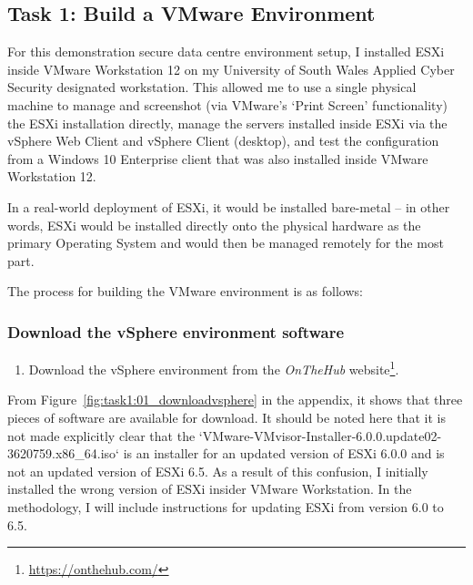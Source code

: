 \pagebreak
\subsection{Task 1: Build a VMware Environment}
For this demonstration secure data centre environment setup, I installed ESXi inside VMware Workstation 12 on my University of South Wales Applied Cyber Security designated workstation. This allowed me to use a single physical machine to manage and screenshot (via VMware's `Print Screen' functionality) the ESXi installation directly, manage the servers installed inside ESXi via the vSphere Web Client and vSphere Client (desktop), and test the configuration from a Windows 10 Enterprise client that was also installed inside VMware Workstation 12.

In a real-world deployment of ESXi, it would be installed bare-metal -- in other words, ESXi would be installed directly onto the physical hardware as the primary Operating System and would then be managed remotely for the most part.

\bigskip
\noindent The process for building the VMware environment is as follows:

\subsubsection{Download the vSphere environment software}
\begin{enumerate}[series=task1methodology]
  \item Download the vSphere environment from the \textit{OnTheHub\textsuperscript{\textregistered}} website\footnote{\url{https://onthehub.com/}}.
\end{enumerate}

\noindent From Figure~\ref{fig:task1:01_downloadvsphere} in the  appendix, it shows that three pieces of software are available for download. It should be noted here that it is not made explicitly clear that the `VMware-VMvisor-Installer-6.0.0.update02-3620759.x86\_64.iso` is an installer for an updated version of ESXi 6.0.0 and is not an updated version of ESXi 6.5. As a result of this confusion, I initially installed the wrong version of ESXi insider VMware Workstation. In the methodology, I will include instructions for updating ESXi from version 6.0 to 6.5.

